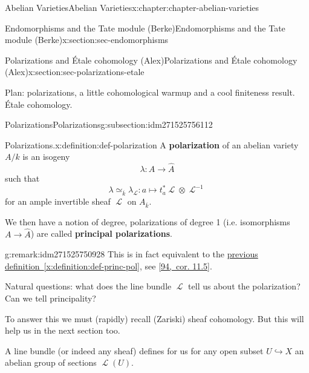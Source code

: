 \documentclass[oneside,10pt,]{book}
\newcommand{\terminology}[1]{\textbf{#1}}
\numberwithin{equation}{section}
\newcommand{\sheaf}[1]{\operatorname{\mathcal{#1}}}
\begin{document}
\begin{chapterptx}{Abelian Varieties}{}{Abelian Varieties}{}{}{x:chapter:chapter-abelian-varieties}
\begin{sectionptx}{Endomorphisms and the Tate module (Berke)}{}{Endomorphisms and the Tate module (Berke)}{}{}{x:section:sec-endomorphisms}
\end{sectionptx}
%
%
\typeout{************************************************}
\typeout{************************************************}
%
\begin{sectionptx}{Polarizations and Étale cohomology (Alex)}{}{Polarizations and Étale cohomology (Alex)}{}{}{x:section:sec-polarizations-etale}
\begin{introduction}{}%
Plan: polarizations, a little cohomological warmup and a cool finiteness result. Étale cohomology.%
\end{introduction}%
%
%
\typeout{************************************************}
\typeout{************************************************}
%
\begin{subsectionptx}{Polarizations}{}{Polarizations}{}{}{g:subsection:idm271525756112}
\begin{definition}{Polarizations.}{x:definition:def-polarization}%
A \terminology{polarization} of an abelian variety \(A/k\) is an isogeny%
\begin{equation*}
\lambda \colon A \to \hat A
\end{equation*}
such that%
\begin{equation*}
\lambda \simeq_{\overline k} \lambda_{\sheaf{L}} : a\mapsto t_a^*\sheaf L \otimes \sheaf L^{-1}
\end{equation*}
for an ample invertible sheaf \(\sheaf L\) on \(A_{\overline k}\).%
\par
We then have a notion of degree, polarizations of degree 1 (i.e. isomorphisms \(A\to \hat A\)) are called \terminology{principal polarizations}.%
\end{definition}
\begin{remark}{}{g:remark:idm271525750928}%
This is in fact equivalent to the \hyperref[x:definition:def-princ-pol]{previous definition~\ref{x:definition:def-princ-pol}}, see \hyperlink{x:biblio:bib-vandergeer-moonen}{[94,~cor. 11.5]}.%
\end{remark}
Natural questions: what does the line bundle \(\sheaf L\) tell us about the polarization? Can we tell principality?%
\par
To answer this we must (rapidly) recall (Zariski) sheaf cohomology. But this will help us in the next section too.%
\par
A line bundle (or indeed any sheaf) defines for us for any open subset \(U \hookrightarrow X\) an abelian group of sections \(\sheaf L(U)\).%

\end{subsectionptx}
\end{sectionptx}
\end{chapterptx}
\end{document}
